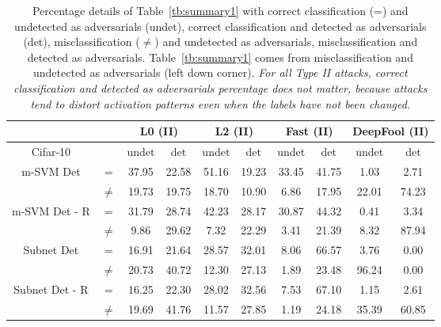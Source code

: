 \documentclass[10pt,twocolumn,letterpaper]{article}
\begin{document}
\begin{table*}[h]
\begin{center}
\resizebox{0.75\textwidth}{!}
{
\begin{tabular}{c | c |c c| c c|c c|c c }
 & & \multicolumn{2}{c|}{L0 (II)} & \multicolumn{2}{c|}{L2 (II)} & \multicolumn{2}{c|}{Fast (II)} & \multicolumn{2}{c}{DeepFool (II)}\\
\hline
Cifar-10 & &   undet   &   det & undet   &   det  & undet   &   det  & undet   &   det \\
\hline
\hline
\multirow{2}{*}{m-SVM Det} & = & 37.95 & 22.58 &51.16 & 19.23 &33.45 & 41.75 & 1.03 &  2.71 \\
& $\not=$& 19.73 & 19.75 & 18.70 & 10.90 & 6.86 & 17.95 & 22.01 & 74.23\\
\hline
\multirow{2}{*}{m-SVM Det - R} & = &  31.79 & 28.74 &  42.23 & 28.17 &  30.87 & 44.32 &   0.41 &  3.34\\
 & $\not=$&  9.86 & 29.62 & 7.32 & 22.29 &  3.41 & 21.39 & 8.32 & 87.94\\
\hline

\multirow{2}{*}{Subnet Det} & = & 16.91 & 21.64 & 28.57 & 32.01 & 8.06 & 66.57 & 3.76 & 0.00 \\
 & $\not=$ & 20.73 & 40.72 & 12.30 & 27.13 & 1.89 & 23.48 & 96.24 & 0.00 \\
\hline
\multirow{2}{*}{Subnet Det - R} & = & 16.25 & 22.30 & 28.02 & 32.56 & 7.53 & 67.10 & 1.15 & 2.61 \\
 & $\not=$ & 19.69 & 41.76 & 11.57 & 27.85 & 1.19 & 24.18 & 35.39 & 60.85 \\

\end{tabular}
}
\caption{Percentage details of Table~\ref{tb:summary1} with correct classification (=) and undetected as adversarials (undet), correct classification and detected as adversarials (det), 
misclassification ($\not=$) and undetected as adversarials, misclassification and detected as adversarials. Table~\ref{tb:summary1} comes from misclassification and undetected as adversarials
(left down corner). \emph{For all Type II attacks, correct classification and detected as adversarials percentage
does not matter, because attacks tend to distort activation patterns even when the labels have not been changed.} }
\label{tb:attack1}
\end{center}
\end{table*}
\end{document}
